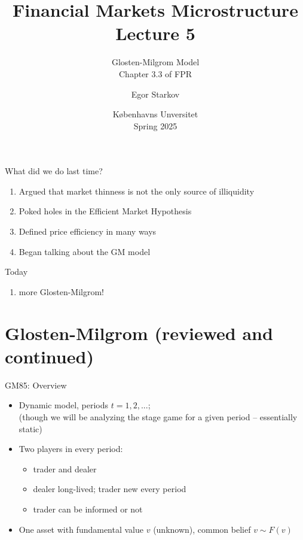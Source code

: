 \documentclass[english,10pt
,aspectratio=169
]{beamer}
\title{Financial Markets Microstructure \\ Lecture 5}
\subtitle{Glosten-Milgrom Model\\
	Chapter 3.3 of FPR}
\author{Egor Starkov}
\date{K{\o}benhavns Unversitet \\
	Spring 2025}
\begin{document}
	\frame[plain]{\titlepage}


\begin{frame}{What did we do last time?}
\begin{enumerate}
	\item Argued that market thinness is not the only source of illiquidity
	\item Poked holes in the Efficient Market Hypothesis
	\item Defined price efficiency in many ways
	\item Began talking about the GM model
\end{enumerate}
\end{frame}


\begin{frame}{Today}
\begin{enumerate}
	\item more Glosten-Milgrom!
\end{enumerate}
\end{frame}


\section{Glosten-Milgrom (reviewed and continued)}


\begin{frame}{GM85: Overview}
	\begin{itemize}
		\item Dynamic model, periods $t = 1,2,...$; \\
		(though we will be analyzing the stage game for a given period -- essentially static)
		\item Two players in every period:
		\begin{itemize}
			\item trader and dealer
			\item \alert{dealer} long-lived; trader new every period
			\item \alert{trader} can be informed or not
		\end{itemize}
		\item One asset with fundamental value $v$ (unknown), common belief $v \sim F(v)$
	\end{itemize}
\end{frame}
\end{document}
